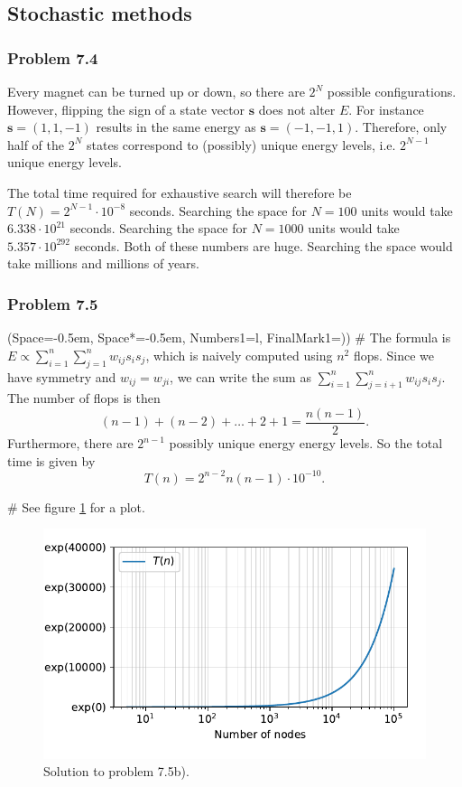 \documentclass[12pt, a4paper]{article}
\newcommand{\listSpace}{-0.5em}%
\newcommand{\vect}[1]{\bm{#1}}
\begin{document}
{\clearpage
\subsection{Stochastic methods}

\subsubsection*{Problem 7.4}
Every magnet can be turned up or down, so there are $2^N$ possible configurations.
However, flipping the sign of a state vector $\vect{s}$ does not alter $E$.
For instance $\vect{s} = (1, 1, -1)$ results in the same energy as $\vect{s} = (-1, -1, 1)$.
Therefore, only half of the $2^N$ states correspond to (possibly) unique energy levels, i.e. $2^{N-1}$ unique energy levels.

The total time required for exhaustive search will therefore be $T(N) = 2^{N-1} \cdot 10^{-8}$ seconds.
Searching the space for $N = 100$ units would take $6.338 \cdot 10^{21}$ seconds.
Searching the space for $N = 1000$ units would take $5.357 \cdot 10^{292}$ seconds.
Both of these numbers are huge. Searching the space would take millions and millions of years.




\subsubsection*{Problem 7.5}
\begin{easylist}[enumerate]
\ListProperties(Space=\listSpace, Space*=\listSpace, Numbers1=l, FinalMark1={)})
# The formula is $E \propto \sum_{i=1}^{n} \sum_{j=1}^{n} w_{ij} s_i s_j$, which is naively computed using $n^2$ flops.
Since we have symmetry and $w_{ij} = w_{ji}$, we can write the sum as $\sum_{i=1}^{n} \sum_{j=i+1}^{n} w_{ij} s_i s_j$.
The number of flops is then
\begin{equation*}
	(n-1) + (n-2) + \dots + 2 + 1 = \frac{n (n-1)}{2}.
\end{equation*}
Furthermore, there are $2^{n-1}$ possibly unique energy energy levels.
So the total time is given by
\begin{equation*}
	T(n) = 2^{n-2} n (n-1) \cdot 10^{-10}.
\end{equation*}

# See figure \ref{fig:duda_ch7_prob5} for a plot.

\begin{figure}[ht!]
\centering
\includegraphics[width=0.7\linewidth]{figs/duda_ch7_prob5}
\caption{Solution to problem 7.5b).}
\label{fig:duda_ch7_prob5}
\end{figure}


\end{easylist}}
\end{document}
